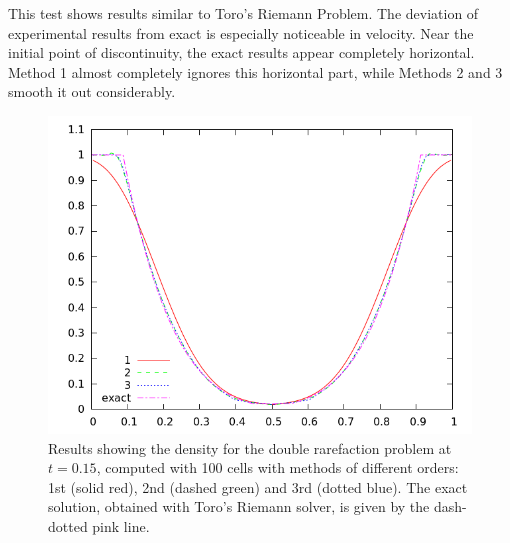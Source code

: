 \documentclass[10pt]{article}
\begin{document}
This test shows results similar to Toro's Riemann Problem. The deviation of experimental results from exact is especially noticeable in velocity. Near the initial point of discontinuity, the exact results appear completely horizontal. Method 1 almost completely ignores this horizontal part, while Methods 2 and 3 smooth it out considerably. 
\begin{figure}[h]
  \begin{center}
     \includegraphics[width=.95\textwidth]{den_T3.png}	
  \end{center}
  \caption{Results showing the density for the double rarefaction problem at $t=0.15$, computed with 100 cells with methods of different orders: 1st (solid red), 2nd (dashed green) and 3rd (dotted blue). The exact solution, obtained with Toro's Riemann solver, is given by the dash-dotted pink line.}
  \label{fig:den_T3}
\end{figure}
\end{document}
